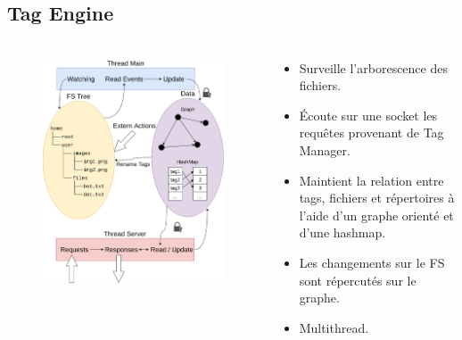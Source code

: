 \documentclass[10pt]{beamer}
\begin{document}
\subsection{Tag Engine}
\begin{frame}
    \frametitle{\subsecname}
    \begin{columns}[T]
        \begin{column}{.5\textwidth}
            \begin{center}
                \begin{figure}
                    \includegraphics[width=1\textwidth]{images/tag_engine.png}
                \end{figure}
            \end{center}
        \end{column}
        \pause
        \begin{column}{.5\textwidth}
            \begin{itemize}
                \item Surveille l’arborescence des fichiers.
                \item Écoute sur une socket les requêtes provenant de Tag Manager.
                \item Maintient la relation entre tags, fichiers et répertoires à l’aide d’un graphe orienté et d’une hashmap.
                \item Les changements sur le FS sont répercutés sur le graphe.
                \item Multithread.
            \end{itemize}
        \end{column}
    \end{columns}
\end{frame}
\end{document}
